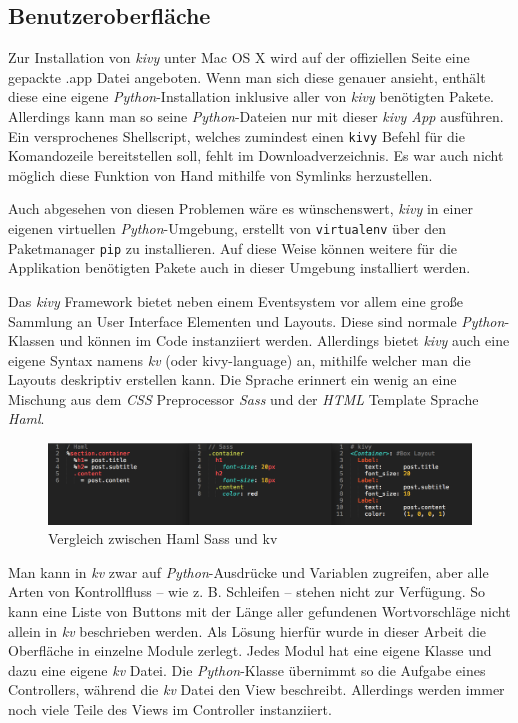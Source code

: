 \subsection{Benutzeroberfläche}
    
    Zur Installation von \emph{kivy} unter Mac OS X wird auf der offiziellen Seite eine gepackte .app Datei angeboten. Wenn man sich diese genauer ansieht, enthält diese eine eigene \emph{Python}-Installation inklusive aller von \emph{kivy} benötigten Pakete. Allerdings kann man so seine \emph{Python}-Dateien nur mit dieser \emph{kivy App} ausführen. Ein versprochenes Shellscript, welches zumindest einen \texttt{kivy} Befehl für die Komandozeile bereitstellen soll, fehlt im Downloadverzeichnis. Es war auch nicht möglich diese Funktion von Hand mithilfe von Symlinks herzustellen.
        
	Auch abgesehen von diesen Problemen wäre es wünschenswert, \emph{kivy} in einer eigenen virtuellen \emph{Python}-Umgebung, erstellt von \texttt{virtualenv} über den Paketmanager \texttt{pip} zu installieren. Auf diese Weise können weitere für die Applikation benötigten Pakete auch in dieser Umgebung installiert werden.
        
    Das \emph{kivy} Framework bietet neben einem Eventsystem vor allem eine große Sammlung an User Interface Elementen und Layouts. Diese sind normale \emph{Python}-Klassen und können im Code instanziiert werden. Allerdings bietet \emph{kivy} auch eine eigene Syntax namens \emph{kv} (oder kivy-language) an, mithilfe welcher man die Layouts deskriptiv erstellen kann. Die Sprache erinnert ein wenig an eine Mischung aus dem \emph{CSS} Preprocessor \emph{Sass} und der \emph{HTML} Template Sprache \emph{Haml}.      
        
	\begin{figure}[H]
    	\centering
    	\includegraphics[width=15cm]{images/hamlsasskv.png}
    	\caption{Vergleich zwischen Haml Sass und kv}
    	\label{img:HamlSassKv}
	\end{figure}
        
	Man kann in \emph{kv} zwar auf \emph{Python}-Ausdrücke und Variablen zugreifen, aber alle Arten von Kontrollfluss  – wie z. B. Schleifen – stehen nicht zur Verfügung. So kann eine Liste von Buttons mit der Länge aller gefundenen Wortvorschläge nicht allein in \emph{kv} beschrieben werden. Als Lösung hierfür wurde in dieser Arbeit die Oberfläche in einzelne Module zerlegt. Jedes Modul hat eine eigene Klasse und dazu eine eigene \emph{kv} Datei. Die \emph{Python}-Klasse übernimmt so die Aufgabe eines Controllers, während die \emph{kv} Datei den View beschreibt. Allerdings werden immer noch viele Teile des Views im Controller instanziiert.